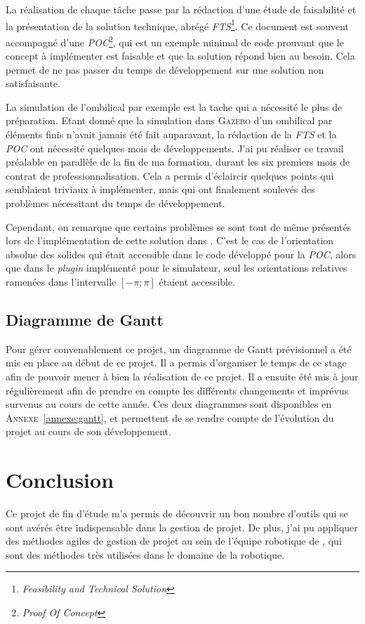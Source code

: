 			La réalisation de chaque tâche passe par la rédaction d'une étude de faisabilité et la présentation de la solution technique, abrégé \textit{FTS}\footnote{\textit{Feasibility and Technical Solution}}. Ce document est souvent accompagné d'une \textit{POC}\footnote{\textit{Proof Of Concept}}, qui est un exemple minimal de code prouvant que le concept à implémenter est faisable et que la solution répond bien au besoin. Cela permet de ne pas passer du temps de développement sur une solution non satisfaisante.

			La simulation de l'ombilical par exemple est la tache qui a nécessité le plus de préparation. Etant donné que la simulation dans \textsc{Gazebo} d'un ombilical par éléments finis n'avait jamais été fait auparavant, la rédaction de la \textit{FTS} et la \textit{POC} ont nécessité quelques mois de développements. J'ai pu réaliser ce travail préalable en parallèle de la fin de ma formation, durant les six premiers mois de contrat de professionnalisation. Cela a permis d'éclaircir quelques points qui semblaient triviaux à implémenter, mais qui ont finalement soulevés des problèmes nécessitant du temps de développement. 
			
			Cependant, on remarque que certains problèmes se sont tout de même présentés lors de l'implémentation de cette solution dans \gazebo{}. C'est le cas de l'orientation absolue des solides qui était accessible dans le code développé pour la \textit{POC}, alors que dans le \textit{plugin} implémenté pour le simulateur, seul les orientations relatives ramenées dans l'intervalle $[-\pi; \pi]$ étaient accessible.

		\subsection{Diagramme de Gantt}
			
			Pour gérer convenablement ce projet, un diagramme de Gantt prévisionnel a été mis en place au début de ce projet. Il a permis d'organiser le temps de ce stage afin de pouvoir mener à bien la réalisation de ce projet. Il a ensuite été mis à jour régulièrement afin de prendre en compte les différents changements et imprévus survenus au cours de cette année. Ces deux diagrammes sont disponibles en \textsc{Annexe}~\ref{annexe:gantt}, et permettent de se rendre compte de l'évolution du projet au cours de son développement.

	\section{Conclusion}
	
		Ce projet de fin d'étude m'a permis de découvrir un bon nombre d'outils qui se sont avérés être indispensable dans la gestion de projet. De plus, j'ai pu appliquer des méthodes agiles de gestion de projet au sein de l'équipe robotique de \forssea{}, qui sont des méthodes très utilisées dans le domaine de la robotique.